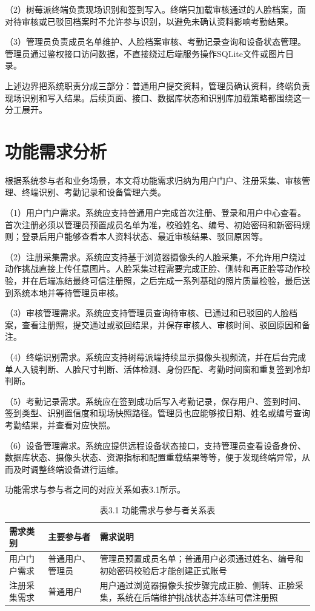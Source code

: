 \documentclass[UTF8]{heuthesis}
\begin{document}
（2）树莓派终端负责现场识别和签到写入。终端只加载审核通过的人脸档案，面对待审核或已驳回档案时不允许参与识别，以避免未确认资料影响考勤结果。

（3）管理员负责成员名单维护、人脸档案审核、考勤记录查询和设备状态管理。管理员通过鉴权接口访问数据，不直接绕过后端服务操作SQLite文件或图片目录。

上述边界把系统职责分成三部分：普通用户提交资料，管理员确认资料，终端负责现场识别和写入结果。后续页面、接口、数据库状态和识别库加载策略都围绕这一分工展开。

\section{功能需求分析}
根据系统参与者和业务场景，本文将功能需求归纳为用户门户、注册采集、审核管理、终端识别、考勤记录和设备管理六类。

（1）用户门户需求。系统应支持普通用户完成首次注册、登录和用户中心查看。首次注册必须以管理员预置成员名单为准，校验姓名、编号、初始密码和新密码规则；登录后用户能够查看本人资料状态、最近审核结果、驳回原因等。

（2）注册采集需求。系统应支持基于浏览器摄像头的人脸采集，不允许用户绕过动作挑战直接上传任意图片。人脸采集过程需要完成正脸、侧转和再正脸等动作校验，并在后端冻结最终可信注册照，之后完成一系列基础的照片质量检验，最后送到系统本地并等待管理员审核。

（3）审核管理需求。系统应支持管理员查询待审核、已通过和已驳回的人脸档案，查看注册照，提交通过或驳回结果，并保存审核人、审核时间、驳回原因和备注。

（4）终端识别需求。系统应支持树莓派端持续显示摄像头视频流，并在后台完成单人入镜判断、人脸尺寸判断、活体检测、身份匹配、考勤时间窗和重复签到冷却判断。

（5）考勤记录需求。系统应在签到成功后写入考勤记录，保存用户、签到时间、签到类型、识别置信度和现场快照路径。管理员也应能够按日期、姓名或编号查询考勤结果，并查看对应快照。

（6）设备管理需求。系统应提供远程设备状态接口，支持管理员查看设备身份、数据库状态、摄像头状态、资源指标和配置重载结果等等，便于发现终端异常，从而及时调整终端设备进行运维。

功能需求与参与者之间的对应关系如表3.1所示。

\begingroup
\small
\begin{longtable}{|>{\raggedright\arraybackslash}p{}|>{\raggedright\arraybackslash}p{}|>{\raggedright\arraybackslash}p{}|}
\caption{表3.1 功能需求与参与者关系表}\\
\hline
需求类别 & 主要参与者 & 需求说明 \\
\hline
用户门户需求 & 普通用户、管理员 & 管理员预置成员名单；普通用户必须通过姓名、编号和初始密码校验后才能创建正式账号 \\
\hline
注册采集需求 & 普通用户 & 用户通过浏览器摄像头按步骤完成正脸、侧转、正脸采集，系统在后端维护挑战状态并冻结可信注册照 \\
\hline
\end{longtable}
\endgroup
\end{document}
